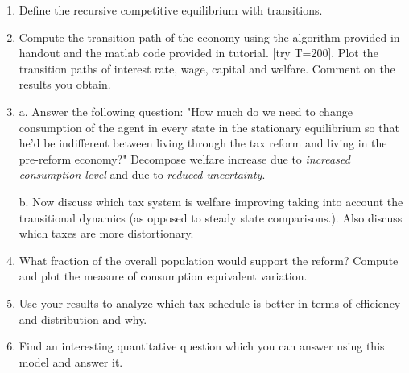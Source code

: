 \documentclass[11pt, a4paper, reqno]{article}
\begin{document}
\begin{enumerate}
\item Define the recursive competitive equilibrium with transitions.

\item Compute the transition path of the economy using  the algorithm provided in handout and the matlab code provided in tutorial. [try T=200]. Plot the transition paths of interest rate, wage, capital and welfare. Comment on the results you obtain.


\item a. Answer the following question: "How much do we need to change consumption of the agent in every state in the stationary equilibrium so that he'd be indifferent between living through the tax reform and living in the pre-reform economy?" Decompose welfare increase due to \textit{increased consumption level} and due to  \textit{reduced uncertainty}.

b. Now discuss which tax system is welfare improving taking into account the transitional dynamics (as opposed to steady state comparisons.). Also discuss which taxes are more distortionary.



\item What fraction of the overall population would support the reform? Compute and plot the measure of consumption equivalent variation.

\item Use your results to analyze which tax schedule is better in terms of efficiency and distribution and why.

\item Find an interesting quantitative question which you can answer using
this model and answer it.
\end{enumerate}
\newpage

\end{document}
